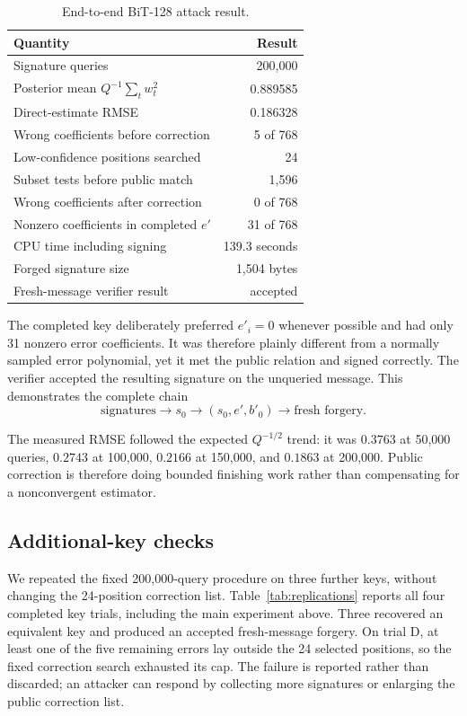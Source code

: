 \documentclass[11pt,a4paper]{article}
\begin{document}
\begin{table}[ht]
\centering
\caption{End-to-end BiT-128 attack result.}
\label{tab:main-result}
\begin{tabular}{@{}lr@{}}
\toprule
Quantity & Result \\
\midrule
Signature queries & 200,000 \\
Posterior mean $Q^{-1}\sum_tw_t^2$ & 0.889585 \\
Direct-estimate RMSE & 0.186328 \\
Wrong coefficients before correction & 5 of 768 \\
Low-confidence positions searched & 24 \\
Subset tests before public match & 1,596 \\
Wrong coefficients after correction & 0 of 768 \\
Nonzero coefficients in completed $e'$ & 31 of 768 \\
CPU time including signing & 139.3 seconds \\
Forged signature size & 1,504 bytes \\
Fresh-message verifier result & accepted \\
\bottomrule
\end{tabular}
\end{table}

The completed key deliberately preferred $e'_i=0$ whenever possible and had
only 31 nonzero error coefficients.  It was therefore plainly different from
a normally sampled error polynomial, yet it met the public relation and signed
correctly.  The verifier accepted the resulting signature on the unqueried
message.  This demonstrates the complete chain
\[
 \text{signatures}\longrightarrow s_0
 \longrightarrow(s_0,e',b'_0)
 \longrightarrow\text{fresh forgery}.
\]

The measured RMSE followed the expected $Q^{-1/2}$ trend: it was $0.3763$ at
50,000 queries, $0.2743$ at 100,000, $0.2166$ at 150,000, and $0.1863$ at
200,000.  Public correction is therefore doing bounded finishing work rather
than compensating for a nonconvergent estimator.

\subsection{Additional-key checks}

We repeated the fixed 200,000-query procedure on three further keys, without
changing the 24-position correction list.  Table~\ref{tab:replications}
reports all four completed key trials, including the main experiment above.
Three recovered an equivalent key and produced an accepted fresh-message
forgery.  On trial D, at least one of the five remaining errors lay outside the
24 selected positions, so the fixed correction search exhausted its cap.  The
failure is reported rather than discarded; an attacker can respond by
collecting more signatures or enlarging the public correction list.
\end{document}
